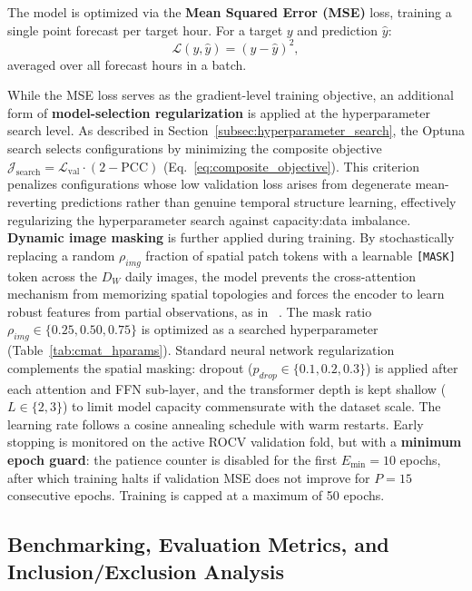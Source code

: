 The model is optimized via the \textbf{Mean Squared Error (MSE)} loss, training a single point forecast per target hour. For a target $y$ and prediction $\hat{y}$:
\begin{equation}
    \mathcal{L}(y, \hat{y}) = (y - \hat{y})^2,
\end{equation}
averaged over all forecast hours in a batch.

While the MSE loss serves as the gradient-level training objective, an additional form of \textbf{model-selection regularization} is applied at the hyperparameter search level. As described in Section~\ref{subsec:hyperparameter_search}, the Optuna search selects configurations by minimizing the composite objective $\mathcal{J}_{\text{search}} = \mathcal{L}_{\text{val}} \cdot (2 - \text{PCC})$ (Eq.~\ref{eq:composite_objective}). This criterion penalizes configurations whose low validation loss arises from degenerate mean-reverting predictions rather than genuine temporal structure learning, effectively regularizing the hyperparameter search against capacity:data imbalance. \textbf{Dynamic image masking} is further applied during training. By stochastically replacing a random $\rho_{img}$ fraction of spatial patch tokens with a learnable \texttt{[MASK]} token across the $D_W$ daily images, the model prevents the cross-attention mechanism from memorizing spatial topologies and forces the encoder to learn robust features from partial observations, as in ~\cite{schubnel_solarcrossformer_2025}. The mask ratio $\rho_{img} \in \{0.25, 0.50, 0.75\}$ is optimized as a searched hyperparameter (Table~\ref{tab:cmat_hparams}). Standard neural network regularization complements the spatial masking: dropout ($p_{drop} \in \{0.1, 0.2, 0.3\}$) is applied after each attention and FFN sub-layer, and the transformer depth is kept shallow ($L \in \{2, 3\}$) to limit model capacity commensurate with the dataset scale. The learning rate follows a cosine annealing schedule with warm restarts. Early stopping is monitored on the active ROCV validation fold, but with a \textbf{minimum epoch guard}: the patience counter is disabled for the first $E_{\min} = 10$ epochs, after which training halts if validation MSE does not improve for $P = 15$ consecutive epochs. Training is capped at a maximum of 50 epochs.

\subsection{Benchmarking, Evaluation Metrics, and Inclusion/Exclusion Analysis}
\label{subsec:evaluation_ablation}

